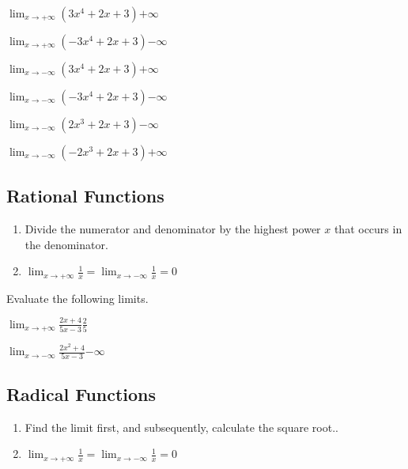 \problemans%
{$\displaystyle \lim_{x\rightarrow+\infty} (3x^4 + 2x + 3)$}{$+\infty$}

\problemans%
{$\displaystyle \lim_{x\rightarrow+\infty} (-3x^4 + 2x + 3)$}{$-\infty$}

\problemans%
{$\displaystyle \lim_{x\rightarrow-\infty} (3x^4 + 2x + 3)$}{$+\infty$}

\problemans%
{$\displaystyle \lim_{x\rightarrow-\infty} (-3x^4 + 2x + 3)$}{$-\infty$}

\problemans%
{$\displaystyle \lim_{x\rightarrow-\infty} (2x^3 + 2x + 3)$}{$-\infty$}

\problemans%
{$\displaystyle \lim_{x\rightarrow-\infty} (-2x^3 + 2x + 3)$}{$+\infty$}


\makenewpage\subsection{Rational Functions}
\begin{myframe}[arc=10pt,auto outer arc]
	\begin{enumerate}
		\item Divide the numerator and denominator by the highest power $x$ that occurs in the denominator.
		\item $\displaystyle \lim_{x\rightarrow+\infty} \frac{1}{x} = \lim_{x\rightarrow-\infty} \frac{1}{x} = 0$
	\end{enumerate}
\end{myframe}

\noindent Evaluate the following limits.

\problemans%
{$\displaystyle \lim_{x\rightarrow+\infty} \frac{2x + 4}{5x - 3}$}{$\frac{2}{5}$}

\problemans%
{$\displaystyle \lim_{x\rightarrow-\infty} \frac{2x^2 + 4}{5x - 3}$}{$-\infty$}


\makenewpage\subsection{Radical Functions}
\begin{myframe}[arc=10pt,auto outer arc]
	\begin{enumerate}
		\item Find the limit first, and subsequently, calculate the square root..
		\item $\displaystyle \lim_{x\rightarrow+\infty} \frac{1}{x} = \lim_{x\rightarrow-\infty} \frac{1}{x} = 0$
	\end{enumerate}
\end{myframe}

